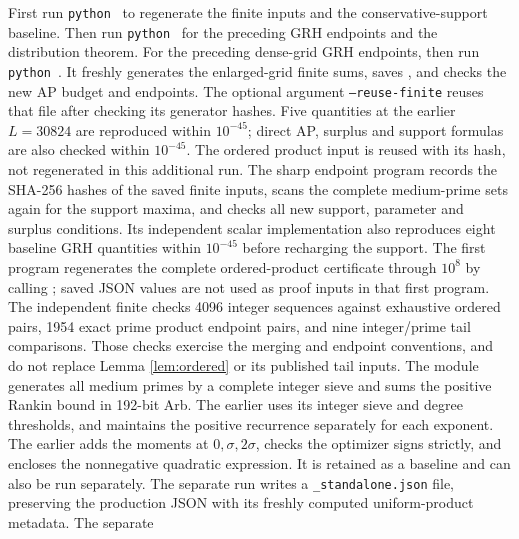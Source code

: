 \documentclass[11pt]{article}
\begin{document}
First run \texttt{python}\ 
to regenerate the finite inputs and the conservative-support baseline.
Then run \texttt{python}\ 
for the preceding GRH endpoints and the distribution theorem.
For the preceding dense-grid GRH endpoints, then run
\texttt{python}\ .
It freshly generates the enlarged-grid finite sums, saves
, and checks the
new AP budget and endpoints. The optional argument
\texttt{--reuse-finite} reuses that file after checking its generator
hashes. Five quantities at the earlier $L=30824$ are reproduced
within $10^{-45}$; direct AP, surplus and support formulas are also
checked within $10^{-45}$. The ordered product input is reused with
its hash, not regenerated in this additional run.
The sharp endpoint program records the SHA-256 hashes of
the saved finite inputs, scans the complete medium-prime sets again for
the support maxima, and checks all new support, parameter and surplus
conditions. Its independent scalar implementation also reproduces eight
baseline GRH quantities within $10^{-45}$ before recharging the support.
The first program regenerates the
complete ordered-product certificate through $10^8$ by calling
; saved
JSON values are not used as proof inputs in that first program.
The independent finite
 checks 4096
integer sequences against exhaustive ordered pairs, 1954 exact prime
product endpoint pairs, and nine integer/prime tail comparisons.
Those checks exercise the merging and endpoint conventions, and do
not replace Lemma \ref{lem:ordered} or its published tail inputs.
The module
 generates all
medium primes by a complete integer sieve and sums the positive Rankin
bound in 192-bit Arb. The earlier
uses its integer sieve and degree thresholds, and maintains the positive
recurrence separately for each exponent. The earlier
adds the moments at $0,\sigma,2\sigma$, checks the optimizer signs
strictly, and encloses the nonnegative quadratic expression.
It is retained as a baseline and can also be run separately.
The separate run writes a \texttt{\_standalone.json} file, preserving
the production JSON with its freshly computed uniform-product metadata.
The separate 
\end{document}
